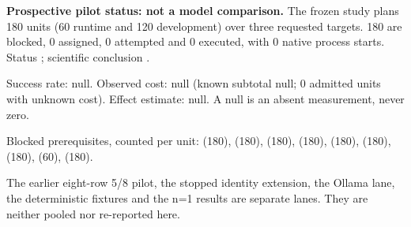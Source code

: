 \textbf{Prospective pilot status: not a model comparison.} The frozen study \texttt{} plans 180 units (60 runtime and 120 development) over three requested targets. 180 are blocked, 0 assigned, 0 attempted and 0 executed, with 0 native process starts. Status \texttt{}; scientific conclusion \texttt{}.

Success rate: null. Observed cost: null (known subtotal null; 0 admitted units with unknown cost). Effect estimate: null. A null is an absent measurement, never zero.

Blocked prerequisites, counted per unit: \texttt{} (180), \texttt{} (180), \texttt{} (180), \texttt{} (180), \texttt{} (180), \texttt{} (180), \texttt{} (180), \texttt{} (60), \texttt{} (180).

The earlier eight-row 5/8 pilot, the stopped identity extension, the Ollama lane, the deterministic fixtures and the n=1 results are separate lanes. They are neither pooled nor re-reported here.
